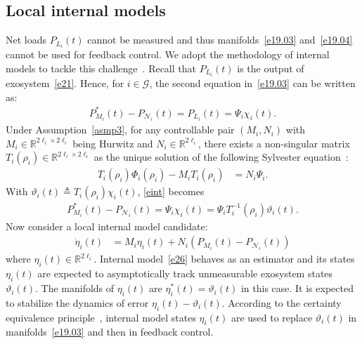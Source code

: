 \documentclass[journal]{IEEEtran}
\newcommand{\real}{\mathds{R}}
\newcommand{\GG}{{\mathcal{G}}}
\newcommand{\NN}{{\mathcal{N}}}
\begin{document}
\subsection{Local internal models}\label{sec:internal}
Net loads $P_{L_i}(t)$ cannot be measured and thus manifolds~\eqref{e19.03} and~\eqref{e19.04} cannot be used for feedback control. We adopt the methodology of internal models to tackle this challenge~\cite{isidori1990output,francis1976internal}.
Recall that $P_{L_i}(t)$ is the output of exosystem~\eqref{e21}. Hence, for $i\in \GG$, the second equation in~\eqref{e19.03} can be written as:
\begin{align}
P_{M_i}^*(t)-P_{\NN_i}(t)= P_{L_i}(t)= \Psi_i \chi_i(t).
\label{eint}
\end{align}
Under Assumption~\ref{asmp3}, for any controllable pair $(M_{i}, N_{i})$ with $M_{i} \in \real^{2\ell_i \times 2\ell_i}$ being Hurwitz and $N_i \in \real^{2\ell_i}$, there exists a non-singular matrix $T_{i}(\rho_i) \in \real^{2\ell_i \times 2\ell_i}$ as the unique solution of the following Sylvester equation~\cite{bhatia1997and}:
\begin{align}
T_{i}(\rho_i) \Phi_i(\rho_i) - M_{i}T_{i}(\rho_i) &= N_{i}\Psi_{i}.
\label{e111}
\end{align}
With $\vartheta_{i}(t) \triangleq T_{i}(\rho_i) \chi_{i}(t)$, \eqref{eint} becomes
\begin{align*}
P_{M_i}^*(t)-P_{\NN_i}(t)= \Psi_{i}\chi_{i}(t)=\Psi_{i} T_{i}^{-1}(\rho_i)\vartheta_{i}(t).
\end{align*}
Now consider a local internal model candidate:
\begin{align}
\dot{\eta}_{i}(t) &= M_{i} \eta_{i}(t) + N_{i} (P_{M_i}(t)-P_{\NN_i}(t))
\label{e26}
\end{align}
where $\eta_i(t) \in \real^{2\ell_i}$.
Internal model~\eqref{e26} behaves as an estimator and its states $\eta_i(t)$ are expected to asymptotically track unmeasurable exosystem states $\vartheta_i(t)$. The manifolds of $\eta_{i}(t)$ are $\eta_i^*(t)=\vartheta_i(t)$ in this case.
It is expected to stabilize the dynamics of error $\eta_i(t)-\vartheta_i(t)$.
According to the certainty equivalence principle~\cite{whittle1986risk}, internal model states $\eta_i(t)$ are used to replace $\vartheta_i(t)$ in manifolds~\eqref{e19.03} and then in feedback control.
\end{document}
